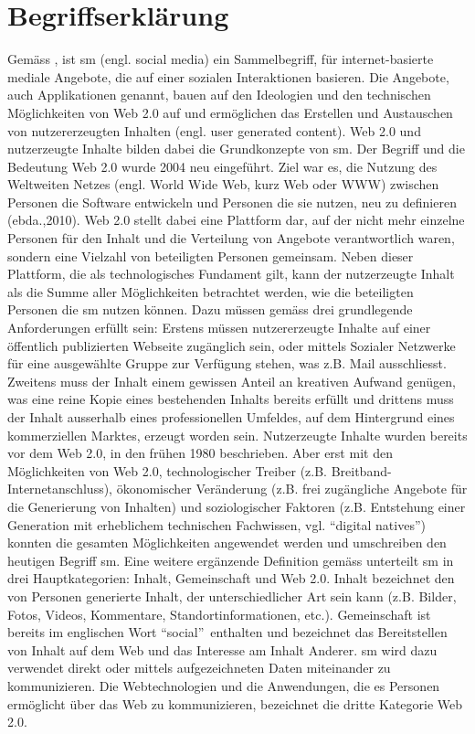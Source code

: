 \section{Begriffserklärung}\label{sec.begriff}
Gemäss , ist \gls{sm} (engl. social media) ein Sammelbegriff, für internet-basierte mediale Angebote, die auf einer sozialen Interaktionen basieren. Die Angebote, auch Applikationen genannt, bauen auf den Ideologien und den technischen Möglichkeiten von Web 2.0 auf \cite{Kaplan:2010} und ermöglichen das Erstellen und Austauschen von nutzererzeugten Inhalten (engl. user generated content).\newline
Web 2.0 und nutzerzeugte Inhalte bilden dabei die Grundkonzepte von \gls{sm}. Der Begriff und die Bedeutung Web 2.0 wurde 2004 neu eingeführt. Ziel war es, die Nutzung des Weltweiten Netzes (engl. World Wide Web, kurz Web oder WWW) zwischen Personen die Software entwickeln und Personen die sie nutzen, neu zu definieren (ebda.,2010). Web 2.0 stellt dabei eine Plattform dar, auf der nicht mehr einzelne Personen für den Inhalt und die Verteilung von Angebote verantwortlich waren, sondern eine Vielzahl von beteiligten Personen gemeinsam. Neben dieser Plattform, die als technologisches Fundament gilt, kann der nutzerzeugte Inhalt als die Summe aller Möglichkeiten betrachtet werden, wie die beteiligten Personen die \gls{sm} nutzen können. Dazu müssen gemäss  drei grundlegende Anforderungen erfüllt sein: Erstens müssen nutzererzeugte Inhalte auf einer öffentlich publizierten Webseite zugänglich sein, oder mittels Sozialer Netzwerke für eine ausgewählte Gruppe zur Verfügung stehen, was z.B. Mail ausschliesst. Zweitens muss der Inhalt einem gewissen Anteil an kreativen Aufwand genügen, was eine reine Kopie eines bestehenden Inhalts bereits erfüllt und drittens muss der Inhalt ausserhalb eines professionellen Umfeldes, auf dem Hintergrund eines kommerziellen Marktes, erzeugt worden sein. Nutzerzeugte Inhalte wurden bereits vor dem Web 2.0, in den frühen 1980 beschrieben. Aber erst mit den Möglichkeiten von Web 2.0, technologischer Treiber (z.B. Breitband-Internetanschluss), ökonomischer Veränderung (z.B. frei zugängliche Angebote für die Generierung von Inhalten) und soziologischer Faktoren (z.B. Entstehung einer Generation mit erheblichem technischen Fachwissen, vgl. \textquotedblleft digital natives\textquotedblright) konnten die gesamten Möglichkeiten angewendet werden und umschreiben den heutigen Begriff \gls{sm}.\newline 
Eine weitere ergänzende Definition gemäss  unterteilt \gls{sm} in drei Hauptkategorien: Inhalt, Gemeinschaft und Web 2.0. Inhalt bezeichnet den von Personen generierte Inhalt, der unterschiedlicher Art sein kann (z.B. Bilder, Fotos, Videos, Kommentare, Standortinformationen, etc.). Gemeinschaft ist bereits im englischen Wort \textquotedblleft social\textquotedblright \ enthalten und bezeichnet das Bereitstellen von Inhalt auf dem Web und das Interesse am Inhalt Anderer. \gls{sm} wird dazu verwendet direkt oder mittels aufgezeichneten Daten miteinander zu kommunizieren. Die Webtechnologien und die Anwendungen, die es Personen ermöglicht über das Web zu kommunizieren, bezeichnet die dritte Kategorie Web 2.0. \newline
